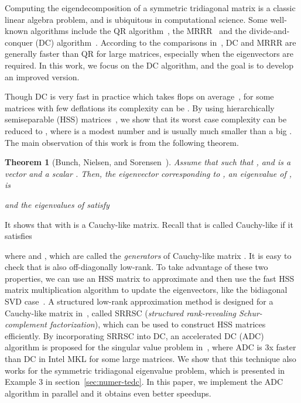 \documentclass[times]{nlaauth}
\newtheorem{theorem}{Theorem}
\newcounter{algorithm}
\begin{document}
Computing the eigendecomposition of a symmetric tridiagonal matrix is a classic linear algebra
problem, and is ubiquitous in computational science.
Some well-known algorithms include the QR algorithm~\cite{Golub-book2,Parlett-book},
the MRRR~\cite{MRRR-LAA} and the divide-and-conquer (DC) algorithm~\cite{Cuppen81,Gu-eigenvalue}.
According to the comparisons in~\cite{Demmel-eig-perf}, DC and MRRR are generally faster than QR for large matrices, especially when
the eigenvectors are required.
In this work, we focus on the DC algorithm, and the goal is to develop an improved version.

Though DC is very fast in practice which takes  flops on average~\cite{Demmel-book,parallel_dc},
for some matrices with few deflations its complexity \cite{Cuppen81,Rutter94,Gu-eigenvalue} can be .
By using hierarchically semiseparable (HSS) matrices~\cite{Hss-ulv,Xia-Fast09},
we show that its worst case complexity can be reduced to , where  is a modest
number and is usually much smaller than a big .
The main observation of this work is from the following theorem.

\begin{theorem}[Bunch, Nielsen, and Sorensen~\cite{BNS-Rankone}]
  \label{thm:BNS-R1}
 Assume that  such that , and  is a vector and a scalar . Then, the eigenvector corresponding to , an eigenvalue of , is
  
  and the eigenvalues of  satisfy
  
\end{theorem}

It shows that  with
 is a Cauchy-like matrix.
Recall that  is called Cauchy-like if it satisfies

  where  and ,
  which are called the \emph{generators} of Cauchy-like matrix .
  It is easy to check that  is also off-diagonally low-rank.
  To take advantage of these two properties, we can use an HSS matrix to approximate  and then
  use the fast HSS matrix multiplication algorithm to update the eigenvectors, like the bidiagonal SVD case~\cite{Shengguo-SIMAX2}.
A structured low-rank approximation method is designed for
  a Cauchy-like matrix in~\cite{GX-Toeplitz,Shengguo-SIMAX2}, called SRRSC (\emph{structured rank-revealing
  Schur-complement factorization}), which can be used to construct HSS matrices efficiently.
  By incorporating SRRSC into DC, an accelerated DC (ADC) algorithm is proposed for the singular value problem in~\cite{Shengguo-SIMAX2},
  where ADC is 3x faster than DC in Intel MKL for some large matrices.
  We show that this technique also works for the symmetric tridiagonal eigenvalue problem,
  which is presented in Example 3 in section~\ref{sec:numer-tedc}.
  In this paper, we implement the ADC algorithm in parallel and it obtains even better speedups.
\end{document}
